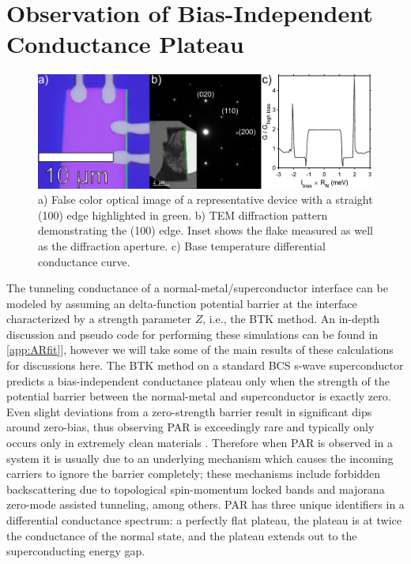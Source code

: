 \section{Observation of Bias-Independent Conductance Plateau}
\begin{figure}[h]
	\centering
	\includegraphics[width = \textwidth]{Chap4/Figures/DeviceFab.pdf}
	\caption{a) False color optical image of a representative device with a straight (100) edge highlighted in green. b) \ac{TEM} diffraction pattern demonstrating the (100) edge. Inset shows the flake measured as well as the diffraction aperture. c) Base temperature differential conductance curve.}
	\label{fig:PARDeviceFab}
\end{figure}
The tunneling conductance of a normal-metal/superconductor interface can be modeled by assuming an delta-function potential barrier at the interface characterized by a strength parameter $Z$, i.e., the \ac{BTK} method. An in-depth discussion and pseudo code for performing these simulations can be found in \ref{app:ARfit}], however we will take some of the main results of these calculations for discussions here. The \ac{BTK} method on a standard \ac{BCS} s-wave superconductor predicts a bias-independent conductance plateau only when the strength of the potential barrier between the normal-metal and superconductor is exactly zero. Even slight deviations from a zero-strength barrier result in significant dips around zero-bias, thus observing \ac{PAR} is exceedingly rare and typically only occurs only in extremely clean materials \cite{Lee2019}. Therefore when \ac{PAR} is observed in a system it is usually due to an underlying mechanism which causes the incoming carriers to ignore the barrier completely; these mechanisms include forbidden backscattering due to topological spin-momentum locked bands and majorana zero-mode assisted tunneling, among others. \ac{PAR} has three unique identifiers in a differential conductance spectrum: a perfectly flat plateau, the plateau is at twice the conductance of the normal state, and the plateau extends out to the superconducting energy gap.\par
